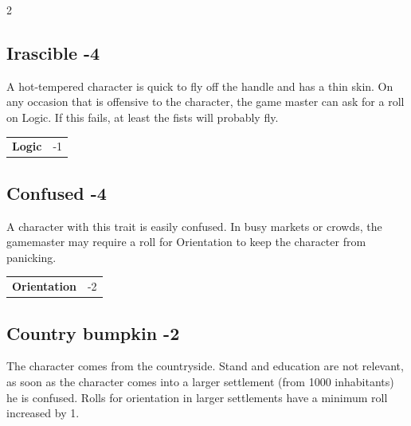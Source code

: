 \begin{multicols}{2}
\begin{tcolorbox}
\end{tcolorbox}

\begin{tcolorbox}
    \subsection*{Irascible \hfill \small{-4 }}
    \tcblower
A hot-tempered character is quick to fly off the handle and has a thin skin. On any occasion that is offensive to the character, the game master can ask for a roll on Logic. If this fails, at least the fists will probably fly.


\vspace{3mm}

\begin{tabular}{@{}ll@{}}
    \textbf{Logic} & -1\\
\end{tabular}


\end{tcolorbox}

\begin{tcolorbox}
    \subsection*{Confused \hfill \small{-4 }}
    \tcblower
A character with this trait is easily confused. In busy markets or crowds, the gamemaster may require a roll for Orientation to keep the character from panicking.


\vspace{3mm}

\begin{tabular}{@{}ll@{}}
    \textbf{Orientation} & -2\\
\end{tabular}


\end{tcolorbox}

\begin{tcolorbox}
    \subsection*{Country bumpkin \hfill \small{-2 }}
    \tcblower
The character comes from the countryside. Stand and education are not relevant, as soon as the character comes into a larger settlement (from 1000 inhabitants) he is confused. Rolls for orientation in larger settlements have a minimum roll increased by 1.



\end{tcolorbox}
\end{multicols}
